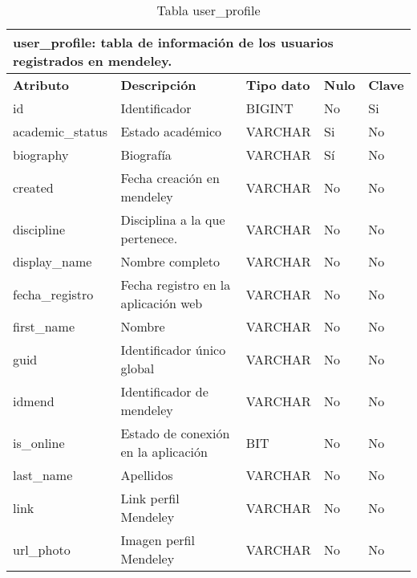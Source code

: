 \begin{table}[!hbt]
	\begin{center}
		\begin{tabular}{|p{3cm}|p{4cm}|p{4cm}|p{2cm}|p{2cm}|}
			\hline
			\multicolumn{5}{|l|}{\textbf{user\_profile:} tabla de información de los usuarios registrados en mendeley.} \\
			\hline
			\hline
			\textbf{Atributo} & \textbf{Descripción} & \textbf{Tipo dato} & \textbf{Nulo} & \textbf{Clave}\\
			\hline
			id & Identificador  & BIGINT & No & Si\\
			\hline
			academic\_status & Estado académico  & VARCHAR & Si & No\\
			\hline
			biography & Biografía  & VARCHAR & Sí & No\\
			\hline
			created & Fecha creación en mendeley & VARCHAR & No & No\\
			\hline
			discipline & Disciplina a la que pertenece. & VARCHAR & No & No\\
			\hline
			display\_name & Nombre completo & VARCHAR & No & No\\
			\hline
			fecha\_registro & Fecha registro en la aplicación web & VARCHAR & No & No\\
			\hline
			first\_name & Nombre & VARCHAR & No & No\\
			\hline
			guid & Identificador único global & VARCHAR & No & No\\
			\hline
			idmend & Identificador de mendeley & VARCHAR & No & No\\
			\hline
			is\_online & Estado de conexión en la aplicación & BIT & No & No\\
			\hline
			last\_name & Apellidos & VARCHAR & No & No\\
			\hline
			link & Link perfil Mendeley & VARCHAR & No & No\\
			\hline
			url\_photo & Imagen perfil Mendeley & VARCHAR & No & No\\
			\hline
		\end{tabular}
		\caption{Tabla user\_profile}
		\label{table:db-userprofile}
	\end{center}
\end{table}


